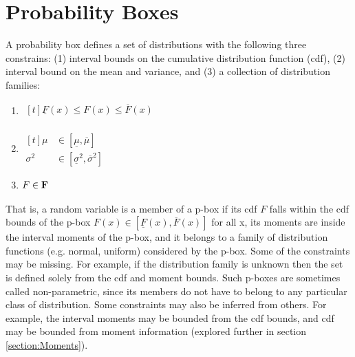 \documentclass{juliacon}
\begin{document}
\section{Probability Boxes}
\label{sec:pboxes}

A probability box defines a set of distributions with the following three constrains: (1) interval bounds on the cumulative distribution function (cdf), (2) interval bound on the mean and variance, and (3) a collection of distribution families:

\begin{enumerate}
  \item $\begin{aligned}[t]
    \underline{F}(x) \leq F(x) \leq \overline{F}(x) \\%
  \end{aligned}$
  \item $\begin{aligned}[t]
    \mu &\in [\underline{ \mu }, \overline{ \mu }]  \\%
    \sigma^2 &\in [\underline{\sigma}^2 , \overline{\sigma}^2]
  \end{aligned}$
  \item $\begin{aligned}[t]
      F \in \bold{F} \\%
  \end{aligned}$
  \end{enumerate}

\noindent That is, a random variable is a member of a p-box if its cdf $F$ falls within the cdf bounds of the p-box $F(x) \in [\underline{F}(x), \overline{F}(x)]$ for all x, its moments are inside the interval moments of the p-box, and it belongs to a family of distribution functions (e.g. normal, uniform) considered by the p-box. Some of the constraints may be missing. For example, if the distribution family is unknown then the set is defined solely from the cdf and moment bounds. Such p-boxes are sometimes called non-parametric, since its members do not have to belong to any particular class of distribution. Some constraints may also be inferred from others. For example, the interval moments may be bounded from the cdf bounds, and cdf may be bounded from moment information (explored further in section \ref{section:Moments}).
\end{document}
